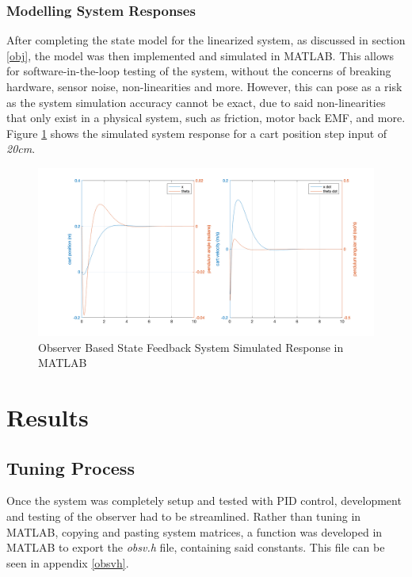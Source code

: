 \documentclass[12pt]{article}
\begin{document}
\subsubsection{Modelling System Responses}
After completing the state model for the linearized system, as discussed in section \ref{obj}, the model was then implemented and simulated in MATLAB. This allows for software-in-the-loop testing of the system, without the concerns of breaking hardware, sensor noise, non-linearities and more. However, this can pose as a risk as the system simulation accuracy cannot be exact, due to said non-linearities that only exist in a physical system, such as friction, motor back EMF, and more. Figure \ref{fig:sim} shows the simulated system response for a cart position step input of \textit{20cm}.
\begin{figure}[H]
    \centering
    \includegraphics[width=1\linewidth]{figures/models.png}
    \caption{Observer Based State Feedback System Simulated Response in MATLAB}
    \label{fig:sim}
\end{figure}
    
\section{Results}

\subsection{Tuning Process}
Once the system was completely setup and tested with PID control, development and testing of the observer had to be streamlined. Rather than tuning in MATLAB, copying and pasting system matrices, a function was developed in MATLAB to export the \textit{obsv.h} file, containing said constants. This file can be seen in appendix \ref{obsvh}.
\end{document}

